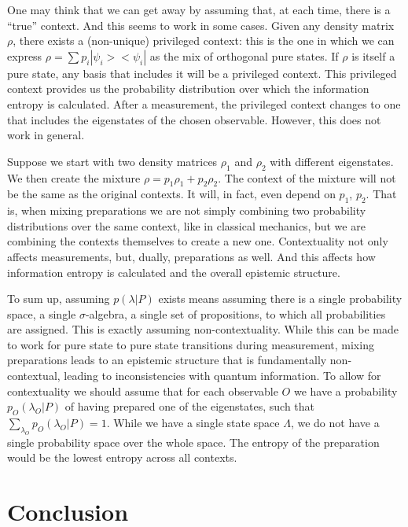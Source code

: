 \documentclass[twocolumn,prl,floatfix,superscriptaddress]{revtex4-2}
\begin{document}
One may think that we can get away by assuming that, at each time, there is a ``true'' context. And this seems to work in some cases. Given any density matrix $\rho$, there exists a (non-unique) privileged context: this is the one in which we can express $\rho = \sum p_i |\psi_i > < \psi_i|$ as the mix of orthogonal pure states. If $\rho$ is itself a pure state, any basis that includes it will be a privileged context. This privileged context provides us the probability distribution over which the information entropy is calculated. After a measurement, the privileged context changes to one that includes the eigenstates of the chosen observable. However, this does not work in general.

Suppose we start with two density matrices $\rho_1$ and $\rho_2$ with different eigenstates. We then create the mixture $\rho = p_1 \rho_1 + p_2 \rho_2$. The context of the mixture will not be the same as the original contexts. It will, in fact, even depend on $p_1$, $p_2$. That is, when mixing preparations we are not simply combining two probability distributions over the same context, like in classical mechanics, but we are combining the contexts themselves to create a new one. Contextuality not only affects measurements, but, dually, preparations as well. And this affects how information entropy is calculated and the overall epistemic structure.

To sum up, assuming $p(\lambda|P)$ exists means assuming there is a single probability space, a single $\sigma$-algebra, a single set of propositions, to which all probabilities are assigned. This is exactly assuming non-contextuality. While this can be made to work for pure state to pure state transitions during measurement, mixing preparations leads to an epistemic structure that is fundamentally non-contextual, leading to inconsistencies with quantum information. To allow for contextuality we should assume that for each observable $O$ we have a probability $p_O(\lambda_O|P)$ of having prepared one of the eigenstates, such that $\sum_{\lambda_O} p_O(\lambda_O|P) = 1$. While we have a single state space $\Lambda$, we do not have a single probability space over the whole space. The entropy of the preparation would be the lowest entropy across all contexts.



\section{Conclusion}



%




\end{document}

